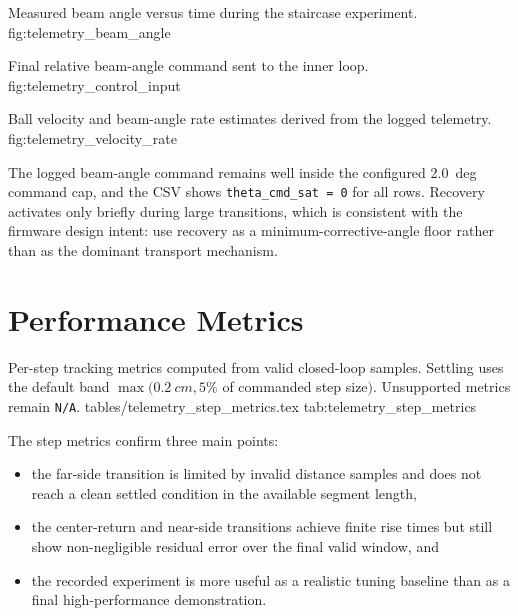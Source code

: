   {Measured beam angle versus time during the staircase experiment.}
  {fig:telemetry_beam_angle}

  {Final relative beam-angle command sent to the inner loop.}
  {fig:telemetry_control_input}

  {Ball velocity and beam-angle rate estimates derived from the logged telemetry.}
  {fig:telemetry_velocity_rate}

The logged beam-angle command remains well inside the configured \SI{2.0}{deg} command
cap, and the CSV shows \verb|theta_cmd_sat = 0| for all rows. Recovery activates only
briefly during large transitions, which is consistent with the firmware design intent:
use recovery as a minimum-corrective-angle floor rather than as the dominant transport
mechanism.

\section{Performance Metrics}

\ReportTableFromFile
  {Per-step tracking metrics computed from valid closed-loop samples. Settling uses the
  default band $\max(\SI{0.2}{cm}, 5\%$ of commanded step size$)$. Unsupported metrics
  remain \texttt{N/A}.}
  {tables/telemetry_step_metrics.tex}
  {tab:telemetry_step_metrics}

The step metrics confirm three main points:

\begin{itemize}
  \item the far-side transition is limited by invalid distance samples and does not
  reach a clean settled condition in the available segment length,
  \item the center-return and near-side transitions achieve finite rise times but still
  show non-negligible residual error over the final valid window, and
  \item the recorded experiment is more useful as a realistic tuning baseline than as a
  final high-performance demonstration.
\end{itemize}
